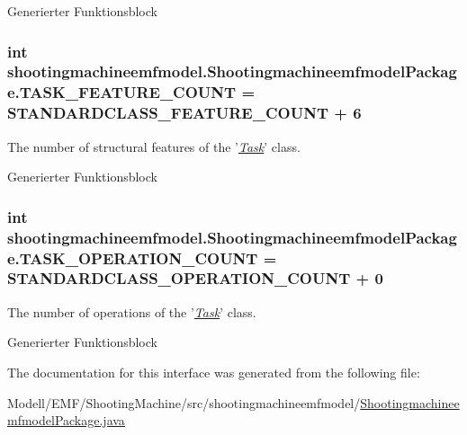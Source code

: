 Generierter Funktionsblock  \hypertarget{interfaceshootingmachineemfmodel_1_1_shootingmachineemfmodel_package_a7938b93e2769090ce3b4ef54dfb6345d}{
\subsubsection[{T\-A\-S\-K\-\_\-\-F\-E\-A\-T\-U\-R\-E\-\_\-\-C\-O\-U\-N\-T}]{\setlength{\rightskip}{0pt plus 5cm}int shootingmachineemfmodel.\-Shootingmachineemfmodel\-Package.\-T\-A\-S\-K\-\_\-\-F\-E\-A\-T\-U\-R\-E\-\_\-\-C\-O\-U\-N\-T = {\bf S\-T\-A\-N\-D\-A\-R\-D\-C\-L\-A\-S\-S\-\_\-\-F\-E\-A\-T\-U\-R\-E\-\_\-\-C\-O\-U\-N\-T} + 6}}\label{interfaceshootingmachineemfmodel_1_1_shootingmachineemfmodel_package_a7938b93e2769090ce3b4ef54dfb6345d}
The number of structural features of the '{\itshape \hyperlink{interfaceshootingmachineemfmodel_1_1_task}{Task}}' class.

Generierter Funktionsblock  \hypertarget{interfaceshootingmachineemfmodel_1_1_shootingmachineemfmodel_package_a9b8a8820092643928f0c1ebab194f957}{
\subsubsection[{T\-A\-S\-K\-\_\-\-O\-P\-E\-R\-A\-T\-I\-O\-N\-\_\-\-C\-O\-U\-N\-T}]{\setlength{\rightskip}{0pt plus 5cm}int shootingmachineemfmodel.\-Shootingmachineemfmodel\-Package.\-T\-A\-S\-K\-\_\-\-O\-P\-E\-R\-A\-T\-I\-O\-N\-\_\-\-C\-O\-U\-N\-T = {\bf S\-T\-A\-N\-D\-A\-R\-D\-C\-L\-A\-S\-S\-\_\-\-O\-P\-E\-R\-A\-T\-I\-O\-N\-\_\-\-C\-O\-U\-N\-T} + 0}}\label{interfaceshootingmachineemfmodel_1_1_shootingmachineemfmodel_package_a9b8a8820092643928f0c1ebab194f957}
The number of operations of the '{\itshape \hyperlink{interfaceshootingmachineemfmodel_1_1_task}{Task}}' class.

Generierter Funktionsblock  

The documentation for this interface was generated from the following file\-:\begin{DoxyCompactItemize}
\item 
Modell/\-E\-M\-F/\-Shooting\-Machine/src/shootingmachineemfmodel/\hyperlink{_shootingmachineemfmodel_package_8java}{Shootingmachineemfmodel\-Package.\-java}\end{DoxyCompactItemize}
